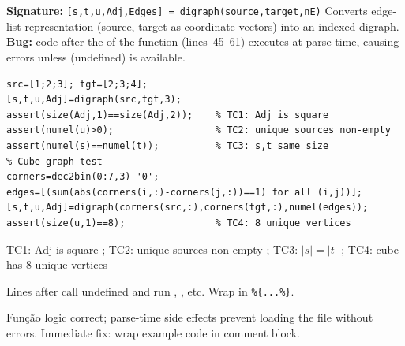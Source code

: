\chapter{}
\begin{tcolorbox}[Abox,title={Analysis}]
\textbf{Signature:} \lstinline|[s,t,u,Adj,Edges] = digraph(source,target,nE)|\quad
Converts edge-list representation (source, target as coordinate vectors) into an indexed digraph. \textbf{Bug:} code after the  of the function (lines~45--61) executes at parse time, causing errors unless  (undefined) is available.
\end{tcolorbox}
\begin{lstlisting}[caption={Tests for digraph.m}]
src=[1;2;3]; tgt=[2;3;4];
[s,t,u,Adj]=digraph(src,tgt,3);
assert(size(Adj,1)==size(Adj,2));    % TC1: Adj is square
assert(numel(u)>0);                  % TC2: unique sources non-empty
assert(numel(s)==numel(t));          % TC3: s,t same size
% Cube graph test
corners=dec2bin(0:7,3)-'0';
edges=[(sum(abs(corners(i,:)-corners(j,:))==1) for all (i,j))];
[s,t,u,Adj]=digraph(corners(src,:),corners(tgt,:),numel(edges));
assert(size(u,1)==8);                % TC4: 8 unique vertices
\end{lstlisting}
\begin{tcolorbox}[Pbox,title={TC1--TC4 -- Logic correct}]
TC1: $\mathrm{Adj}$ is square \APROVADO; TC2: unique sources non-empty \APROVADO; TC3: $|s|=|t|$ \APROVADO; TC4: cube has 8 unique vertices \APROVADO
\end{tcolorbox}
\begin{tcolorbox}[Bbox,title={Bug: Parse-Time Code Execution}]
Lines after  call undefined  and run , , etc. Wrap in \lstinline|%{...%}|.
\end{tcolorbox}
\begin{concl}
Função logic correct; parse-time side effects prevent loading the file without errors. Immediate fix: wrap example code in comment block.
\end{concl}

